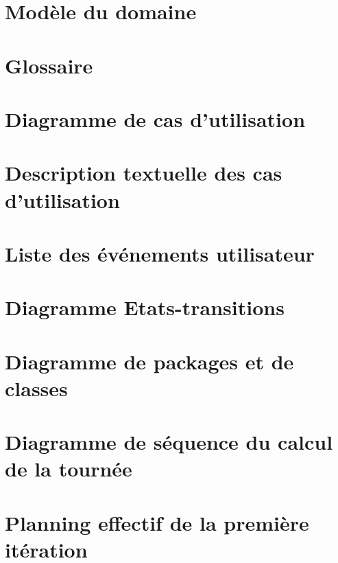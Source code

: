\documentclass[a4paper,10pt]{article}
\begin{document}
\begin{titlepage}
  
\end{titlepage}
\tableofcontents
\pagebreak

\section{Modèle du domaine}

\section{Glossaire}



\section{Diagramme de cas d'utilisation}

\section{Description textuelle des cas d’utilisation}

\section{Liste des événements utilisateur}

\section{Diagramme Etats-transitions}

\section{Diagramme de packages et de classes}

\section{Diagramme de séquence du calcul de la tournée}

\section{Planning effectif de la première itération}
\end{document}
